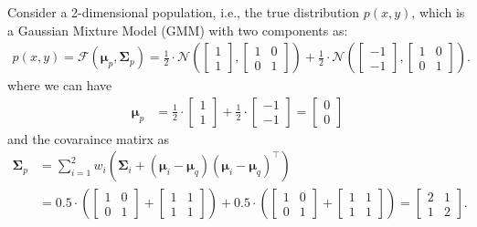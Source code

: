 Consider a 2-dimensional population, i.e., the true distribution \( p(x, y) \), which is a Gaussian Mixture Model (GMM) with two components as:
\begin{align}
\label{eq:estimated_dist}
    p({x}, {y}) = \mathcal{F}(\boldsymbol{\mu}_p,\boldsymbol{\Sigma}_p)= \frac{1}{2} \cdot \mathcal{N}\left(\begin{bmatrix} 1 \\ 1 \end{bmatrix}, \begin{bmatrix} 1 & 0 \\ 0 & 1 \end{bmatrix}\right) + \frac{1}{2} \cdot \mathcal{N}\left(\begin{bmatrix} -1 \\ -1 \end{bmatrix}, \begin{bmatrix} 1 & 0 \\ 0 & 1 \end{bmatrix}\right).
\end{align}
where we can have 
\begin{align*}
    \boldsymbol{\mu}_p &= \frac{1}{2} \cdot \begin{bmatrix} 1 \\ 1 \end{bmatrix} + \frac{1}{2} \cdot \begin{bmatrix} -1 \\ -1 \end{bmatrix} =\begin{bmatrix} 0 \\ 0 \end{bmatrix}
\end{align*}
and the covaraince matirx as
\begin{align*}
    \boldsymbol{\Sigma}_p &= \sum_{i=1}^2 w_i \left( \boldsymbol{\Sigma}_i + (\boldsymbol{\mu}_i - \boldsymbol{\mu}_q)(\boldsymbol{\mu}_i - \boldsymbol{\mu}_q)^\top \right) \\
    &= 0.5 \cdot \left( \begin{bmatrix} 1 & 0 \\ 0 & 1 \end{bmatrix} + \begin{bmatrix} 1 & 1 \\ 1 & 1 \end{bmatrix} \right) + 0.5 \cdot \left( \begin{bmatrix} 1 & 0 \\ 0 & 1 \end{bmatrix} + \begin{bmatrix} 1 & 1 \\ 1 & 1 \end{bmatrix} \right) = \begin{bmatrix} 2 & 1 \\ 1 & 2 \end{bmatrix}.
\end{align*}
